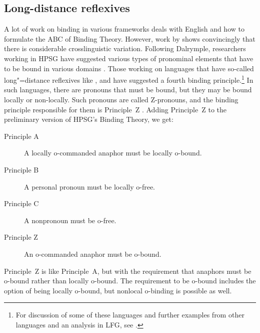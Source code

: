 \documentclass[output=paper,biblatex,babelshorthands,newtxmath,draftmode,colorlinks,citecolor=brown]{langscibook}
\begin{document}
\subsection{Long-distance reflexives}

A lot of work on binding in various frameworks deals with English and how to formulate the ABC of
Binding Theory. However, work by \citet{Dalrymple93a} shows convincingly that there is considerable
crosslinguistic variation. Following Dalrymple, researchers working in HPSG have suggested various types of pronominal
elements that have to be bound in various domains \citep{AGS1998a,Koenig1999b,XPS94a-u,PX98a,BM99a,Hellan2005a}.
Those working on languages that have so-called long"=distance
reflexives\label{page-long-distance-reflexives} like ,
 and 
\citep*{XPS94a-u,PX98a,BM99a,Hellan2005a} have suggested a fourth binding principle.\footnote{
For discussion of some of these languages and further examples from other languages and an analysis
in LFG\indexlfg, see .
} In such languages, there are pronouns that must be bound, but they may be bound locally or non-locally.
Such pronouns are called Z-pronouns, and the binding principle responsible for them is
Principle~Z \citep[]{BM99a}. Adding Principle~Z to the preliminary version of HPSG's
Binding Theory, we get:
\begin{principle-break}
\begin{description}
\item [Principle A] A locally o-commanded anaphor must be locally o-bound.
\item [Principle B] A personal pronoun must be locally o-free.
\item [Principle C] A nonpronoun must be o-free.
\item [Principle Z] An o-commanded anaphor must be o-bound.
\end{description}
\end{principle-break}
Principle~Z is like Principle~A, but with the requirement that anaphors must be o-bound rather than
locally o-bound. The requirement to be o-bound includes the option of being locally o-bound, but
nonlocal o-binding is possible as well. 
\end{document}
